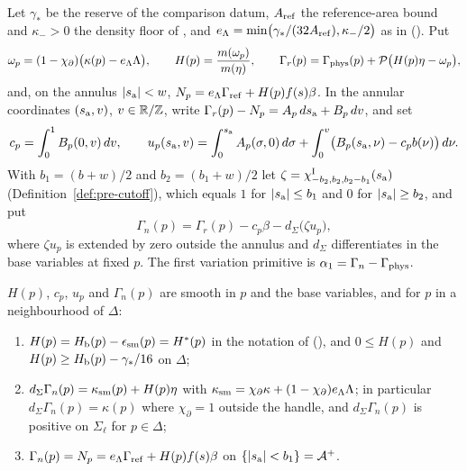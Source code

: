 \begin{construction}\label{cons:native-normalization}
Let $\gamma_*$ be the reserve of the comparison datum, $A_{\rm ref}$ the reference-area bound and $\kappa_->0$ the density floor
of , and $e_\Lambda=\min\bigl(\gamma_*/(32A_{\rm ref}),\kappa_-/2\bigr)$ as in
(). Put
\[
 \omega_p=(1-\chi_\partial)\bigl(\kappa(p)-e_\Lambda\Lambda\bigr),\qquad
 H(p)=\frac{m(\omega_p)}{m(\eta)},\qquad
 \Gamma_r(p)=\Gamma_{\rm phys}(p)+\mathcal P\bigl(H(p)\eta-\omega_p\bigr),
\]
and, on the annulus $|s_{\rm a}|<w$, $N_p=e_\Lambda\Gamma_{\rm ref}+H(p)f(s)\beta$. In the annular coordinates $(s_{\rm a},v)$,
$v\in\mathbb{R}/\mathbb{Z}$, write $\Gamma_r(p)-N_p=A_p\,ds_{\rm a}+B_p\,dv$, and set
\[
 c_p=\int_0^1B_p(0,v)\,dv,\qquad
 u_p(s_{\rm a},v)=\int_0^{s_{\rm a}}A_p(\sigma,0)\,d\sigma+\int_0^v\bigl(B_p(s_{\rm a},\nu)-c_pb(\nu)\bigr)\,d\nu .
\]
With $b_1=(b+w)/2$ and $b_2=(b_1+w)/2$ let $\zeta=\chi^{\rm I}_{-b_2,b_2,b_2-b_1}(s_{\rm a})$ (Definition~\ref{def:pre-cutoff}),
which equals $1$ for $|s_{\rm a}|\le b_1$ and $0$ for $|s_{\rm a}|\ge b_2$, and put
\[
 \Gamma_n(p)=\Gamma_r(p)-c_p\beta-d_\Sigma\bigl(\zeta u_p\bigr),
\]
where $\zeta u_p$ is extended by zero outside the annulus and $d_\Sigma$ differentiates in the base variables at fixed $p$. The first
variation primitive is $\alpha_1=\Gamma_n-\Gamma_{\rm phys}$.
\end{construction}

\begin{proposition}\label{prop:native-normalization}
$H(p)$, $c_p$, $u_p$ and $\Gamma_n(p)$ are smooth in $p$ and the base variables, and for $p$ in a neighbourhood of $\Delta$:
\begin{enumerate}[label=(\roman*)]
\item $H(p)=H_{\mathrm b}(p)-\epsilon_{\rm sm}(p)=H^*(p)$ in the notation of (), and
 $0\le H(p)$ and $H(p)\ge H_{\mathrm b}(p)-\gamma_*/16$ on $\Delta$;
\item $d_\Sigma\Gamma_n(p)=\kappa_{\rm sm}(p)+H(p)\eta$ with $\kappa_{\rm sm}=\chi_\partial\kappa+(1-\chi_\partial)e_\Lambda\Lambda$; in particular
 $d_\Sigma\Gamma_n(p)=\kappa(p)$ where $\chi_\partial=1$ outside the handle, and $d_\Sigma\Gamma_n(p)$ is positive on $\Sigma_\ell$ for
 $p\in\Delta$;
\item $\Gamma_n(p)=N_p=e_\Lambda\Gamma_{\rm ref}+H(p)f(s)\beta$ on $\{|s_{\rm a}|<b_1\}=\mathcal A^+$.
\end{enumerate}
\end{proposition}

